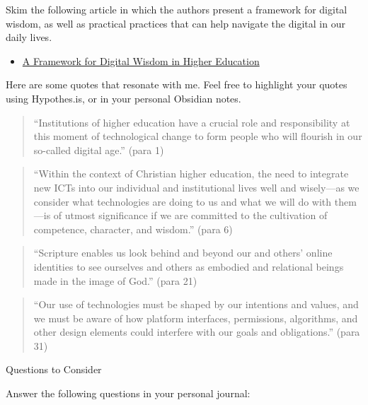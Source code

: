 \documentclass[
]{book}
\providecommand{\tightlist}{%
  \setlength{\itemsep}{0pt}\setlength{\parskip}{0pt}}
\theoremstyle{definition}
\theoremstyle{definition}
\theoremstyle{definition}
\theoremstyle{definition}
\theoremstyle{remark}
\begin{document}
\begin{reflect}
Skim the following article in which the authors present a framework for digital wisdom, as well as practical practices that can help navigate the digital in our daily lives.

\begin{itemize}
\tightlist
\item
  \href{https://christianscholars.com/a-framework-for-digital-wisdom-in-higher-education/}{A Framework for Digital Wisdom in Higher Education}
\end{itemize}

Here are some quotes that resonate with me. Feel free to highlight your quotes using Hypothes.is, or in your personal Obsidian notes.

\begin{quote}
``Institutions of higher education have a crucial role and responsibility at this moment of technological change to form people who will flourish in our so-called digital age.'' (para 1)
\end{quote}

\begin{quote}
``Within the context of Christian higher education, the need to integrate new ICTs into our individual and institutional lives well and wisely---as we consider what technologies are doing to us and what we will do with them---is of utmost significance if we are committed to the cultivation of competence, character, and wisdom.'' (para 6)
\end{quote}

\begin{quote}
``Scripture enables us look behind and beyond our and others' online identities to see ourselves and others as embodied and relational beings made in the image of God.'' (para 21)
\end{quote}

\begin{quote}
``Our use of technologies must be shaped by our intentions and values, and we must be aware of how platform interfaces, permissions, algorithms, and other design elements could interfere with our goals and obligations.'' (para 31)
\end{quote}

{Questions to Consider}

Answer the following questions in your personal journal:


\end{reflect}
\end{document}
